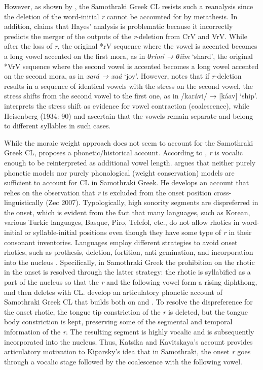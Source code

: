 \documentclass[output=paper,
modfonts
]{LSP/langsci}
\begin{document}
However, as shown by \citet{topintzi2006k}, the Samothraki Greek CL resists
such a reanalysis since the deletion of the word-initial \emph{r} cannot
be accounted for by metathesis. In addition, \citet{kiparsky2011k} claims that
Hayes' analysis is problematic because it incorrectly predicts the
merger of the outputs of the \emph{r}-deletion from CrV and VrV. While
after the loss of \emph{r}, the original *rV sequence where the vowel is
accented becomes a long vowel accented on the first mora, as in
\emph{θrími → θíim} `shard', the original *VrV sequence where the second
vowel is accented becomes a long vowel accented on the second mora, as
in \emph{xará → xaá} `joy'. However, \citet[91]{heisenberg1934} notes that if
\emph{r}-deletion results in a sequence of identical vowels with the
stress on the second vowel, the stress shifts from the second vowel to
the first one, as in /karávi/ → {[}káav{]} `ship'. \citet[79]{newton1972b}
interprets the stress shift as evidence for vowel contraction
(coalescence), while Heisenberg (1934: 90) and \citet{margariti-Rogka2011} ascertain that the vowels remain separate and belong to
different syllables in such cases.

While the moraic weight approach does not seem to account for the
Samothraki Greek CL, \citet{kavitskaya2002} proposes a phonetic/historical
account. According to \citet[99]{kavitskaya2002}, \emph{r} is vocalic enough
to be reinterpreted as additional vowel length. \citet{kiparsky2011k} argues
that neither purely phonetic models nor purely phonological (weight
conservation) models are sufficient to account for CL in Samothraki
Greek. He develops an account that relies on the observation that
\emph{r} is excluded from the onset position cross-linguistically (Zec
2007). Typologically, high sonority segments are dispreferred in the
onset, which is evident from the fact that many languages, such as
Korean, various Turkic languages, Basque, Piro, Telefol, etc., do not
allow rhotics in word-initial or syllable-initial positions \citep{deLacy2001,smith2003k} even though they have some type of \emph{r} in their
consonant inventories. Languages employ different strategies to avoid
onset rhotics, such as prothesis, deletion, fortition, anti-gemination,
and incorporation into the nucleus \citep[26]{kiparsky2011k}. Specifically, in
Samothraki Greek the prohibition on the rhotic in the onset is resolved
through the latter strategy: the rhotic is syllabified as a part of the
nucleus so that the \emph{r} and the following vowel form a rising
diphthong, and then deletes with CL. \citet{katsika2015}
develop an articulatory phonetic account of Samothraki Greek CL that
builds both on \citet{kavitskaya2002} and \citet{kiparsky2011k}. To resolve the
dispreference for the onset rhotic, the tongue tip constriction of the
\emph{r} is deleted, but the tongue body constriction is kept,
preserving some of the segmental and temporal information of the
\emph{r}. The resulting segment is highly vocalic and is subsequently
incorporated into the nucleus. Thus, Katsika and Kavitskaya's \citet{katsika2015}
account provides articulatory motivation to Kiparsky's idea that in
Samothraki, the onset \emph{r} goes through a vocalic stage followed by
the coalescence with the following vowel.
\end{document}
